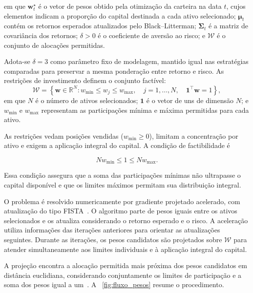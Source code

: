 \noindent
em que $\boldsymbol{w}_t^{\star}$ é o vetor de pesos obtido
pela otimização da carteira na data $t$, cujos elementos
indicam a proporção do capital destinada a cada ativo
selecionado;
$\boldsymbol{\mu}_t$ contém os retornos esperados atualizados
pelo Black--Litterman;
$\boldsymbol{\Sigma}_t$ é a matriz de covariância dos retornos;
$\delta>0$ é o coeficiente de aversão ao risco;
e $\mathcal{W}$ é o conjunto de alocações permitidas.

Adota-se $\delta=3$ como parâmetro fixo de modelagem,
mantido igual nas estratégias comparadas para preservar
a mesma ponderação entre retorno e risco.
As restrições de investimento definem o conjunto factível:
\begin{equation}
    \mathcal{W}
    =
    \left\{
        \boldsymbol{w}\in\mathbb{R}^{N}:
        w_{\min}\leq w_j\leq w_{\max},
        \quad j=1,\ldots,N,
        \quad
        \boldsymbol{1}^{\top}\boldsymbol{w}=1
    \right\},
    \label{eq:simplex_truncado}
\end{equation}
\noindent
em que $N$ é o número de ativos selecionados;
$\boldsymbol{1}$ é o vetor de uns de dimensão $N$;
e $w_{\min}$ e $w_{\max}$ representam as participações
mínima e máxima permitidas para cada ativo.

As restrições vedam posições vendidas ($w_{\min}\geq 0$),
limitam a concentração por ativo e exigem a aplicação integral
do capital. A condição de factibilidade é

\begin{equation}
    Nw_{\min}\leq1\leq Nw_{\max}.
    \label{eq:condicao_factibilidade}
\end{equation}

Essa condição assegura que a soma das participações mínimas
não ultrapasse o capital disponível e que os limites máximos
permitam sua distribuição integral.

O problema é resolvido numericamente por gradiente projetado
acelerado, com atualização do tipo FISTA~\cite{beck2009fista}.
O algoritmo parte de pesos iguais entre os ativos selecionados
e os atualiza considerando o retorno esperado e o risco.
A aceleração utiliza informações das iterações anteriores
para orientar as atualizações seguintes.
Durante as iterações, os pesos candidatos são projetados
sobre $\mathcal{W}$ para atender simultaneamente aos limites
individuais e à aplicação integral do capital.

A projeção encontra a alocação permitida mais próxima
dos pesos candidatos em distância euclidiana, considerando
conjuntamente os limites de participação e a soma dos pesos
igual a um~\cite{wang2015projection}.
A ~\ref{fig:fluxo_pesos} resume o procedimento.

